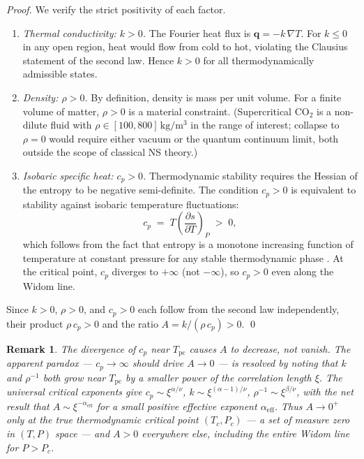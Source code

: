 \documentclass[12pt,a4paper]{article}
\newtheorem{remark}[theorem]{Remark}
\newcommand{\Tc}{T_{\mathrm{pc}}}   %
\begin{document}
\begin{proof}
  We verify the strict positivity of each factor.
  \begin{enumerate}[label=(\roman*)]
    \item \emph{Thermal conductivity: $k > 0$.}  The Fourier heat flux is
      $\bm{q} = -k\,\nabla T$.  For $k \leq 0$ in any open region, heat would
      flow from cold to hot, violating the Clausius statement of the second law.
      Hence $k > 0$ for all thermodynamically admissible states.

    \item \emph{Density: $\rho > 0$.}  By definition, density is mass per unit
      volume.  For a finite volume of matter, $\rho > 0$ is a material
      constraint.  (Supercritical CO$_2$ is a non-dilute fluid with
      $\rho \in [100, 800]\,\si{\kilo\gram\per\metre\cubed}$ in the range of
      interest; collapse to $\rho = 0$ would require either vacuum or the
      quantum continuum limit, both outside the scope of classical NS theory.)

    \item \emph{Isobaric specific heat: $c_p > 0$.}  Thermodynamic stability
      requires the Hessian of the entropy to be negative semi-definite.
      The condition $c_p > 0$ is equivalent to stability against isobaric
      temperature fluctuations:
      \begin{equation}
        c_p \;=\; T\left(\frac{\partial s}{\partial T}\right)_P \;>\; 0,
      \end{equation}
      which follows from the fact that entropy is a monotone increasing function
      of temperature at constant pressure for any stable thermodynamic phase
      \citep{Callen1985}.  At the critical point, $c_p$ diverges to $+\infty$
      (not $-\infty$), so $c_p > 0$ even along the Widom line.
  \end{enumerate}
  Since $k > 0$, $\rho > 0$, and $c_p > 0$ each follow from the second law
  independently, their product $\rho\,c_p > 0$ and the ratio
  $A = k/(\rho\,c_p) > 0$.  \qed
\end{proof}

\begin{remark}
  The divergence of $c_p$ near $\Tc$ causes $A$ to \emph{decrease}, not vanish.
  The apparent paradox --- $c_p \to \infty$ should drive $A \to 0$ --- is resolved
  by noting that $k$ and $\rho^{-1}$ both grow near $\Tc$ by a smaller power of the
  correlation length $\xi$.  The universal critical exponents \citep{Pelissetto2002}
  give $c_p \sim \xi^{\alpha/\nu}$, $k \sim \xi^{(\alpha-1)/\nu}$,
  $\rho^{-1} \sim \xi^{\beta/\nu}$, with the net result that
  $A \sim \xi^{-\alpha_{\mathrm{eff}}}$ for a small positive effective exponent
  $\alpha_{\mathrm{eff}}$.  Thus $A \to 0^+$ \emph{only at} the true thermodynamic
  critical point $(T_c, P_c)$ --- a set of measure zero in $(T,P)$ space --- and
  $A > 0$ everywhere else, including the entire Widom line for $P > P_c$.
\end{remark}
\end{document}
